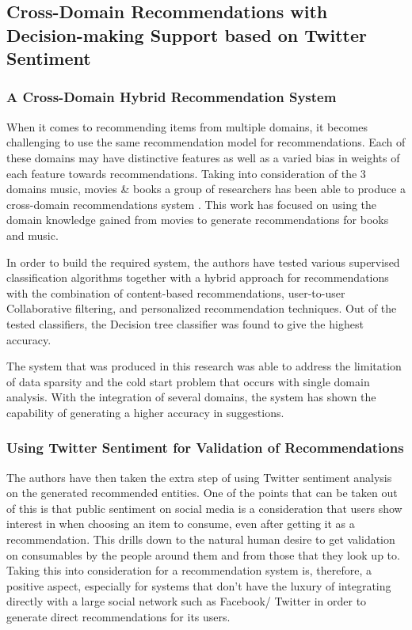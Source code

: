 \documentclass[manuscript,screen,natbib=false]{acmart}
\begin{document}
\subsection{Cross-Domain Recommendations with Decision-making Support based on Twitter Sentiment}
\subsubsection{A Cross-Domain Hybrid Recommendation System}
When it comes to recommending items from multiple domains, it becomes challenging to use the same recommendation model for recommendations. Each of these domains may have distinctive features as well as a varied bias in weights of each feature towards recommendations.
Taking into consideration of the 3 domains music, movies \& books a group of researchers has been able to produce a cross-domain recommendations system \cite{ayushi_cross-domain_2018}. This work has focused on using the domain knowledge gained from movies to generate recommendations for books and music.

In order to build the required system, the authors have tested various supervised classification algorithms together with a hybrid approach for recommendations with the combination of content-based recommendations, user-to-user Collaborative filtering, and personalized recommendation techniques. Out of the tested classifiers, the Decision tree classifier was found to give the highest accuracy.

The system that was produced in this research was able to address the limitation of data sparsity and the cold start problem that occurs with single domain analysis. With the integration of several domains, the system has shown the capability of generating a higher accuracy in suggestions.

\subsubsection{Using Twitter Sentiment for Validation of Recommendations}
The authors have then taken the extra step of using Twitter sentiment analysis on the generated recommended entities. One of the points that can be taken out of this is that public sentiment on social media is a consideration that users show interest in when choosing an item to consume, even after getting it as a recommendation. This drills down to the natural human desire to get validation on consumables by the people around them and from those that they look up to. Taking this into consideration for a recommendation system is, therefore, a positive aspect, especially for systems that don't have the luxury of integrating directly with a large social network such as Facebook/ Twitter in order to generate direct recommendations for its users.
\end{document}
